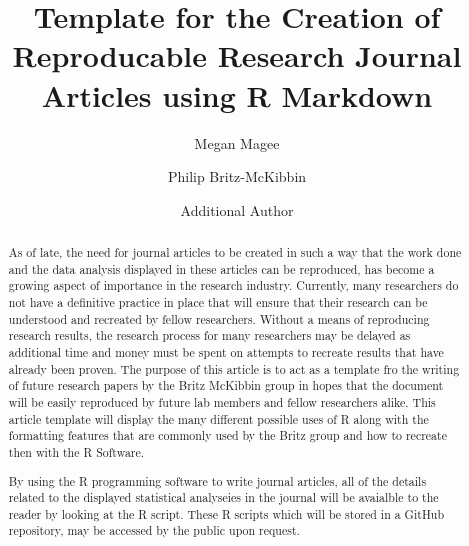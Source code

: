 \documentclass[]{elsarticle} %
\begin{document}
\begin{frontmatter}

  \title{Template for the Creation of Reproducable Research Journal Articles
using R Markdown}
    \author[Some Institute of Technology]{Megan Magee}
    \author[Another University]{Philip Britz-McKibbin}
  
    \author[Again Another University]{Additional Author}
  
  
      \address[Some Institute of Technology]{McMaster University, Department of Chemistry and Chemical Biology, Main
St W, Hamilton, ON, L8S 4L8}
    \address[Another University]{McMaster University, Department of Chemsitry and Chemical Biology, Main
St W, Hamilton, ON, L8S 4L8}
    \address[Again Another University]{McMaster Children's Hospital, Main St W, Hamilton, ON, L8N 3Z5}
  
  \begin{abstract}
  As of late, the need for journal articles to be created in such a way
  that the work done and the data analysis displayed in these articles can
  be reproduced, has become a growing aspect of importance in the research
  industry. Currently, many researchers do not have a definitive practice
  in place that will ensure that their research can be understood and
  recreated by fellow researchers. Without a means of reproducing research
  results, the research process for many researchers may be delayed as
  additional time and money must be spent on attempts to recreate results
  that have already been proven. The purpose of this article is to act as
  a template fro the writing of future research papers by the Britz
  McKibbin group in hopes that the document will be easily reproduced by
  future lab members and fellow researchers alike. This article template
  will display the many different possible uses of R along with the
  formatting features that are commonly used by the Britz group and how to
  recreate then with the R Software.
  
  By using the R programming software to write journal articles, all of
  the details related to the displayed statistical analyseies in the
  journal will be avaialble to the reader by looking at the R script.
  These R scripts which will be stored in a GitHub repository, may be
  accessed by the public upon request.
  \end{abstract}
  
 \end{frontmatter}
\end{document}
